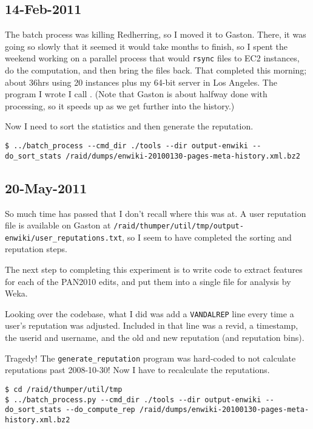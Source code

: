 \subsection{14-Feb-2011}

The batch process was killing Redherring, so I moved it to Gaston.
There, it was going so slowly that it seemed it would take months
to finish, so I spent the weekend working on a parallel process that
would \texttt{rsync} files to EC2 instances, do the computation,
and then bring the files back.
That completed this morning; about 36hrs using 20 instances plus
my 64-bit server in Los Angeles.
The program I wrote I call .
(Note that Gaston is about halfway done with processing, so
it speeds up as we get further into the history.)

Now I need to sort the statistics and then generate the reputation.
\begin{verbatim}
$ ../batch_process --cmd_dir ./tools --dir output-enwiki --do_sort_stats /raid/dumps/enwiki-20100130-pages-meta-history.xml.bz2
\end{verbatim}

\subsection{20-May-2011}

So much time has passed that I don't recall where this was at.
A user reputation file is available on Gaston at
\texttt{/raid/thumper/util/tmp/output-enwiki/user\_reputations.txt},
so I seem to have completed the sorting and reputation steps.

The next step to completing this experiment is to write code to
extract features for each of the PAN2010 edits, and put them into
a single file for analysis by Weka.

Looking over the codebase, what I did was add a \texttt{VANDALREP}
line every time a user's reputation was adjusted.
Included in that line was a revid, a timestamp, the userid and username,
and the old and new reputation (and reputation bins).

Tragedy!  The \texttt{generate\_reputation} program was hard-coded
to not calculate reputations past 2008-10-30!
Now I have to recalculate the reputations.

\begin{verbatim}
$ cd /raid/thumper/util/tmp
$ ../batch_process.py --cmd_dir ./tools --dir output-enwiki --do_sort_stats --do_compute_rep /raid/dumps/enwiki-20100130-pages-meta-history.xml.bz2
\end{verbatim}

